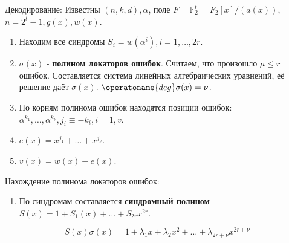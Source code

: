 \documentclass[11pt]{article}
\newcounter{th}\setcounter{th}{0}
\begin{document}
Декодирование:
Известны \((n, k, d), \alpha\), поле \(F = \mathbb{F}_2^t = F_2[x] / (a(x))\), \(n = 2^t - 1, g(x), w(x)\).
\begin{enumerate}
\item Находим все синдромы \(S_i = w(\alpha^i), i = 1, \ldots, 2r\).
\item \(\sigma(x)\) - \textbf{полином локаторов ошибок}. Считаем, что произошло \(\mu \leq r\) ошибок. Составляется система линейных алгебраических уравнений, её решение даёт \(\sigma(x)\). \(\operatoname{deg}\sigma(x) = \nu\).
\item По корням полинома ошибок находятся позиции ошибок: \(\alpha^{k_1}, \ldots, \alpha^{k_{\nu}}, j_i \equiv -k_i, i = \overline{1, v}\).
\item \(e(x) = x^{j_1} + \ldots + x^{j_{\nu}}\).
\item \(v(x) = w(x) + e(x)\).
\end{enumerate}
Нахождение полинома локаторов ошибок:
\begin{enumerate}
\item По синдромам составляется \textbf{синдромный полином} \(S(x) = 1 + S_1(x) + \ldots + S_{2r}x^{2r}\).
\end{enumerate}
$$S(x)\sigma(x) = 1 + \lambda_1x + \lambda_2x^2 + \ldots + \lambda_{2r + \nu}x^{2r + \nu}$$
\end{document}
